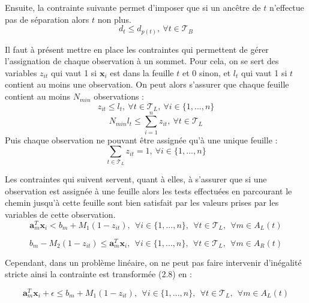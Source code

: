 \documentclass[12pt]{report}
\begin{document}
Ensuite, la contrainte suivante permet d'imposer que si un ancêtre de \(t\) n'effectue pas de séparation alors \(t\) non plus.
\begin{equation}
    d_t \leq d_{p(t)},~ \forall t \in \mathcal{T}_B 
\end{equation}

Il faut à présent mettre en place les contraintes qui permettent de gérer l'assignation de chaque observation à un sommet. Pour cela, on se sert des variables \(z_{it}\) qui vaut 1 si \(\mathbf{x}_i\) est dans la feuille \(t\) et 0 sinon, et \(l_t\) qui vaut 1 si \(t\) contient au moins une observation.
On peut alors s'assurer que chaque feuille contient au moins \(N_{min}\) observations :
\begin{equation}
    z_{it} \leq l_t,~ \forall t \in \mathcal{T}_L, ~ \forall i \in \{1,...,n\}
\end{equation}
\begin{equation}
    N_{min}l_t \leq \sum_{i=1}^n z_{it},~ \forall t \in \mathcal{T}_L
\end{equation}
Puis chaque observation ne pouvant être assignée qu'à une unique feuille :
\begin{equation}
    \sum_{t\in \mathcal{T}_L} z_{it} = 1,~ \forall i \in \{1,...,n\}
\end{equation}

Les contraintes qui suivent servent, quant à elles, à s'assurer que si une observation est assignée à une feuille alors les tests effectuées en parcourant le chemin jusqu'à cette feuille sont bien satisfait par les valeurs prises par les variables de cette observation.
\begin{equation}
    \mathbf{a}_m^T\mathbf{x}_i < b_m + M_1(1-z_{it}),~~ \forall i \in \{1,...,n\},~~ \forall t \in \mathcal{T}_L,~~ \forall m \in A_L(t)
\end{equation}

\begin{equation}
     b_m - M_2(1-z_{it}) \leq \mathbf{a}_m^T\mathbf{x}_i,~~ \forall i \in \{1,...,n\},~~ \forall t \in \mathcal{T}_L,~~ \forall m \in A_R(t)
\end{equation}

Cependant, dans un problème linéaire, on ne peut pas faire intervenir d'inégalité stricte ainsi la contrainte est transformée (2.8) en :

\begin{equation}
    \mathbf{a}_m^T\mathbf{x}_i + \epsilon \leq b_m + M_1(1-z_{it}),~~ \forall i \in \{1,...,n\},~~ \forall t \in \mathcal{T}_L,~~ \forall m \in A_L(t)
\end{equation}
\end{document}
